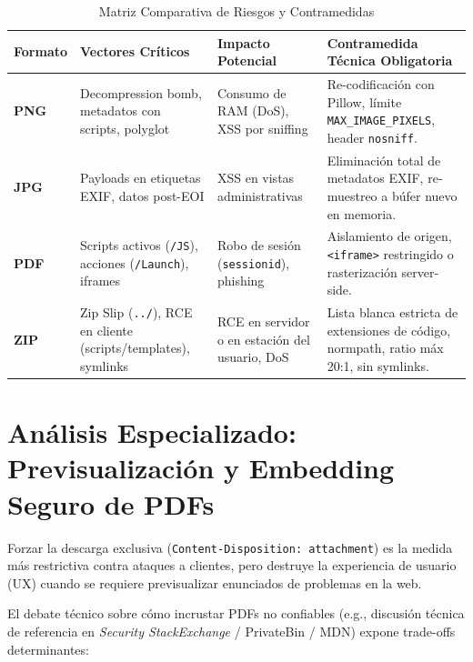 \documentclass[11pt,a4paper]{article}
\begin{document}
\vspace{0.4em}
\begin{table}[h!]
\centering
\small
{}
\caption{Matriz Comparativa de Riesgos y Contramedidas}
\label{tab:riesgos}
\begin{tabularx}{\textwidth}{l p{4.2cm} p{3.8cm} X}
\toprule
\textbf{Formato} & \textbf{Vectores Críticos} & \textbf{Impacto Potencial} & \textbf{Contramedida Técnica Obligatoria} \\
\midrule
\textbf{PNG} & Decompression bomb, metadatos con scripts, polyglot & Consumo de RAM (DoS), XSS por sniffing & Re-codificación con Pillow, límite \texttt{MAX\_IMAGE\_PIXELS}, header \texttt{nosniff}. \\
\addlinespace
\textbf{JPG} & Payloads en etiquetas EXIF, datos post-EOI & XSS en vistas administrativas & Eliminación total de metadatos EXIF, re-muestreo a búfer nuevo en memoria. \\
\addlinespace
\textbf{PDF} & Scripts activos (\texttt{/JS}), acciones (\texttt{/Launch}), iframes & Robo de sesión (\texttt{sessionid}), phishing & Aislamiento de origen, \texttt{\textless iframe\textgreater} restringido o rasterización server-side. \\
\addlinespace
\textbf{ZIP} & Zip Slip (\texttt{../}), RCE en cliente (scripts/templates), symlinks & RCE en servidor o en estación del usuario, DoS & Lista blanca estricta de extensiones de código, normpath, ratio máx 20:1, sin symlinks. \\
\bottomrule
\end{tabularx}
\end{table}

\section{Análisis Especializado: Previsualización y Embedding Seguro de PDFs}

Forzar la descarga exclusiva (\texttt{Content-Disposition: attachment}) es la medida más restrictiva contra ataques a clientes, pero destruye la experiencia de usuario (UX) cuando se requiere previsualizar enunciados de problemas en la web.

El debate técnico sobre cómo incrustar PDFs no confiables (e.g., discusión técnica de referencia en \textit{Security StackExchange} / PrivateBin / MDN) expone trade-offs determinantes:
\end{document}
